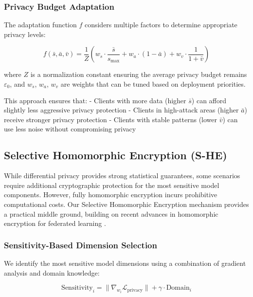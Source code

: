 \documentclass{ieeeaccess}
\theoremstyle{definition}
\begin{document}
\subsubsection{Privacy Budget Adaptation}

The adaptation function $f$ considers multiple factors to determine appropriate privacy levels:

\begin{equation}
f(\bar{s}, \bar{a}, \bar{v}) = \frac{1}{Z} \left( w_s \cdot \frac{\bar{s}}{s_{\max}} + w_a \cdot (1 - \bar{a}) + w_v \cdot \frac{1}{1 + \bar{v}} \right)
\end{equation}

where $Z$ is a normalization constant ensuring the average privacy budget remains $\varepsilon_0$, and $w_s$, $w_a$, $w_v$ are weights that can be tuned based on deployment priorities.

This approach ensures that:
- Clients with more data (higher $\bar{s}$) can afford slightly less aggressive privacy protection
- Clients in high-attack areas (higher $\bar{a}$) receive stronger privacy protection
- Clients with stable patterns (lower $\bar{v}$) can use less noise without compromising privacy

\subsection{Selective Homomorphic Encryption (S-HE)}

While differential privacy provides strong statistical guarantees, some scenarios require additional cryptographic protection for the most sensitive model components. However, fully homomorphic encryption incurs prohibitive computational costs. Our Selective Homomorphic Encryption mechanism provides a practical middle ground, building on recent advances in homomorphic encryption for federated learning \cite{choi2024fednic, islam2025smart, kumar2022homomorphic}.

\subsubsection{Sensitivity-Based Dimension Selection}

We identify the most sensitive model dimensions using a combination of gradient analysis and domain knowledge:

\begin{equation}
\text{Sensitivity}_i = \|\nabla_{w_i} \mathcal{L}_{\text{privacy}}\| + \gamma \cdot \text{Domain}_i
\end{equation}
\end{document}
